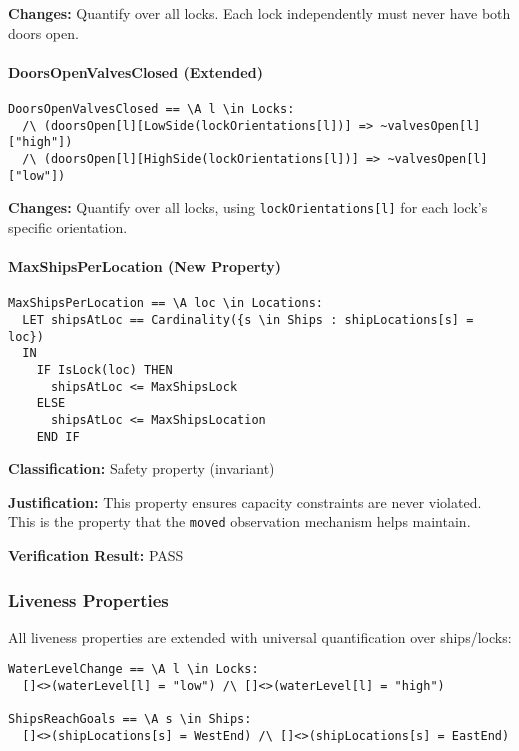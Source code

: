 \documentclass[12pt,a4paper]{article}
\begin{document}
\textbf{Changes:} Quantify over all locks. Each lock independently must never have both doors open.

\paragraph{DoorsOpenValvesClosed (Extended)}
\begin{lstlisting}[style=tlaplus]
DoorsOpenValvesClosed == \A l \in Locks:
  /\ (doorsOpen[l][LowSide(lockOrientations[l])] => ~valvesOpen[l]["high"])
  /\ (doorsOpen[l][HighSide(lockOrientations[l])] => ~valvesOpen[l]["low"])
\end{lstlisting}

\textbf{Changes:} Quantify over all locks, using \texttt{lockOrientations[l]} for each lock's specific orientation.

\paragraph{MaxShipsPerLocation (New Property)}
\begin{lstlisting}[style=tlaplus]
MaxShipsPerLocation == \A loc \in Locations:
  LET shipsAtLoc == Cardinality({s \in Ships : shipLocations[s] = loc})
  IN
    IF IsLock(loc) THEN
      shipsAtLoc <= MaxShipsLock
    ELSE
      shipsAtLoc <= MaxShipsLocation
    END IF
\end{lstlisting}

\textbf{Classification:} Safety property (invariant)

\textbf{Justification:} This property ensures capacity constraints are never violated. This is the property that the \texttt{moved} observation mechanism helps maintain.

\textbf{Verification Result:} \checkmark{} PASS

\subsubsection{Liveness Properties}

All liveness properties are extended with universal quantification over ships/locks:

\begin{lstlisting}[style=tlaplus]
WaterLevelChange == \A l \in Locks:
  []<>(waterLevel[l] = "low") /\ []<>(waterLevel[l] = "high")

ShipsReachGoals == \A s \in Ships:
  []<>(shipLocations[s] = WestEnd) /\ []<>(shipLocations[s] = EastEnd)
\end{lstlisting}
\end{document}
